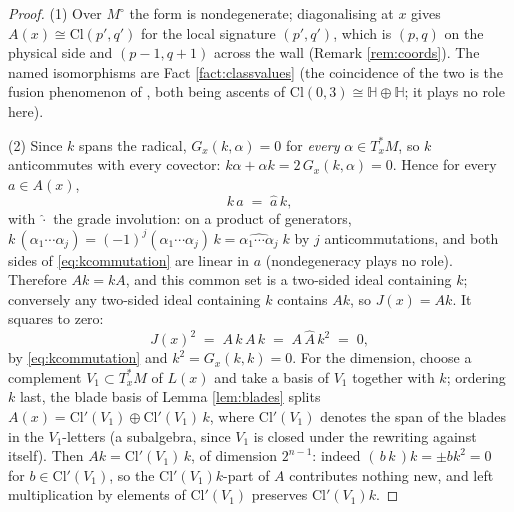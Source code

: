 \documentclass[11pt]{article}
\theoremstyle{definition}
\newcommand{\Cl}{\mathrm{Cl}}
\newcommand{\HH}{\mathbb{H}}
\newcommand{\shL}{L}
\newcommand{\Mo}{M^{\circ}}
\begin{document}
\begin{proof}
(1) Over $\Mo$ the form is nondegenerate; diagonalising at $x$ gives $A(x) \cong \Cl(p', q')$ for the local signature $(p', q')$, which is $(p,q)$ on the physical side and $(p{-}1, q{+}1)$ across the wall (Remark \ref{rem:coords}). The named isomorphisms are Fact \ref{fact:classvalues} (the coincidence of the two is the fusion phenomenon of \cite[Ex.~5.10]{ButlerT1}, both being ascents of $\Cl(0,3) \cong \HH \oplus \HH$; it plays no role here).

(2) Since $k$ spans the radical, $G_x(k, \alpha) = 0$ for \emph{every} $\alpha \in T^*_xM$, so $k$ anticommutes with every covector: $k\alpha + \alpha k = 2\,G_x(k,\alpha) = 0$. Hence for every $a \in A(x)$,
\begin{equation}\label{eq:kcommutation}
k\,a \;=\; \hat{a}\,k ,
\end{equation}
with $\hat{\cdot}$ the grade involution: on a product of generators, $k\,(\alpha_1 \cdots \alpha_j) = (-1)^j (\alpha_1 \cdots \alpha_j)\, k = \widehat{\alpha_1 \cdots \alpha_j}\; k$ by $j$ anticommutations, and both sides of \eqref{eq:kcommutation} are linear in $a$ (nondegeneracy plays no role). Therefore $A k = k A$, and this common set is a two-sided ideal containing $k$; conversely any two-sided ideal containing $k$ contains $Ak$, so $J(x) = Ak$. It squares to zero:
\[
J(x)^2 \;=\; A\,k\,A\,k \;=\; A\,\hat{A}\,k^2 \;=\; 0 ,
\]
by \eqref{eq:kcommutation} and $k^2 = G_x(k,k) = 0$. For the dimension, choose a complement $V_1 \subset T^*_xM$ of $\shL(x)$ and take a basis of $V_1$ together with $k$; ordering $k$ last, the blade basis of Lemma \ref{lem:blades} splits $A(x) = \Cl'(V_1) \oplus \Cl'(V_1)\,k$, where $\Cl'(V_1)$ denotes the span of the blades in the $V_1$-letters (a subalgebra, since $V_1$ is closed under the rewriting against itself). Then $Ak = \Cl'(V_1)\,k$, of dimension $2^{n-1}$: indeed $(\,b\,k\,)k = \pm b k^2 = 0$ for $b \in \Cl'(V_1)$, so the $\Cl'(V_1)k$-part of $A$ contributes nothing new, and left multiplication by elements of $\Cl'(V_1)$ preserves $\Cl'(V_1)k$.


\end{proof}
\end{document}

